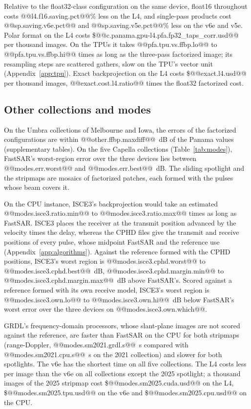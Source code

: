 \documentclass[11pt]{article}
\begin{document}
Relative to the float32-class configuration on the same device, float16 throughout costs @@l4.f16.saving.pct@@\% less on the L4, and single-pass products cost @@sp.saving.v6e.pct@@ and @@sp.saving.v5e.pct@@\% less on the v6e and v5e. Polar format on the L4 costs \$@@c.panama.gpu-l4.pfa.fp32_taps_corr.usd@@ per thousand images. On the TPUs it takes @@pfa.tpu.vs.ffbp.lo@@ to @@pfa.tpu.vs.ffbp.hi@@ times as long as the three-pass factorized image; its resampling steps are scattered gathers, slow on the TPU's vector unit (Appendix~\ref{app:tpu}). Exact backprojection on the L4 costs \$@@exact.l4.usd@@ per thousand images, @@exact.cost.l4.ratio@@ times the float32 factorized cost.


\subsection{Other collections and modes}
\label{sec:general}

On the Umbra collections of Melbourne and Iowa, the errors of the factorized configurations are within @@other.ffbp.maxdiff@@~dB of the Panama values (supplementary tables). On the five Capella collections (Table~\ref{tab:modes}), FastSAR's worst-region error over the three devices lies between @@modes.err.worst@@ and @@modes.err.best@@~dB. The sliding spotlight and the stripmaps are mosaics of factorized patches, each formed with the pulses whose beam covers it.

On the CPU instance, ISCE3's backprojection would take an estimated @@modes.isce3.ratio.min@@ to @@modes.isce3.ratio.max@@ times as long as FastSAR. ISCE3 places the receiver at the transmit position advanced by the velocity times the delay, whereas the CPHD files give the transmit and receive positions of every pulse, whose midpoint FastSAR and the reference use (Appendix~\ref{app:algorithms}). Against the reference formed with the CPHD positions, ISCE3's worst region is @@modes.isce3.cphd.worst@@ to @@modes.isce3.cphd.best@@~dB, @@modes.isce3.cphd.margin.min@@ to @@modes.isce3.cphd.margin.max@@~dB above FastSAR's. Scored against a reference formed with its own receive model, ISCE3's worst region is @@modes.isce3.own.lo@@ to @@modes.isce3.own.hi@@~dB below FastSAR's worst error over the three devices on @@modes.isce3.own.which@@.

GRDL's frequency-domain processors, whose slant-plane images are not scored against the reference, are faster than FastSAR on the CPU for both stripmaps (range-Doppler, @@modes.sm2021.grdl.s@@~s compared with @@modes.sm2021.cpu.s@@~s on the 2021 collection) and slower for both spotlights. The v6e has the shortest time on all five collections. The L4 costs less per image than the v6e on all collections except the 2025 spotlight; a thousand images of the 2025 stripmap cost \$@@modes.sm2025.cuda.usd@@ on the L4, \$@@modes.sm2025.tpu.usd@@ on the v6e and \$@@modes.sm2025.cpu.usd@@ on the CPU.
\end{document}
